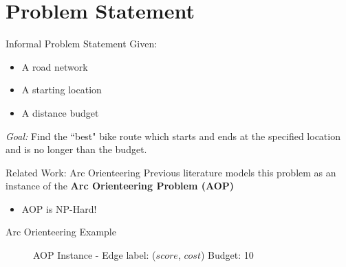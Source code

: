 \documentclass{beamer}
\begin{document}
\section{Problem Statement}

\begin{frame}{Informal Problem Statement}
    Given:
    \begin{itemize}
        \item A road network
        \item A starting location
        \item A distance budget
    \end{itemize}
    \emph{Goal:} Find the ``best" bike route which starts and ends at the specified location and is no longer than the budget.
\end{frame}

\begin{frame}{Related Work: Arc Orienteering}
Previous literature \cite{souffriau2011planning} \cite{verbeeck2014extension} \cite{lu2015arc} models this problem as an instance of the \textbf{Arc Orienteering Problem (AOP)}
\begin{itemize}
    \item AOP is NP-Hard!
\end{itemize}
\end{frame}

\begin{frame}{Arc Orienteering Example}
\begin{figure}
    \caption{AOP Instance - Edge label: ($score$, \ul{$cost$}) Budget: 10}
    \end{figure}  
\end{frame}
\end{document}

